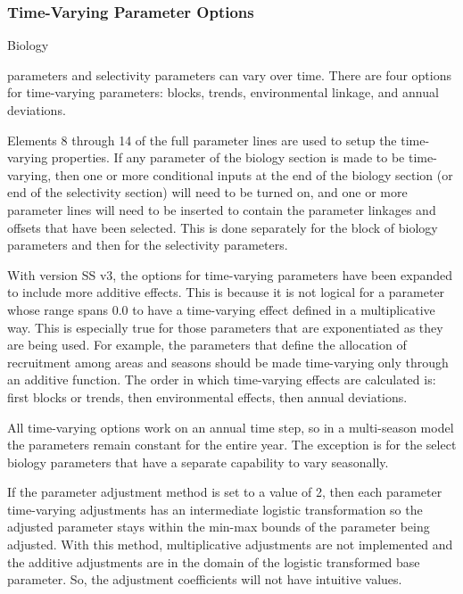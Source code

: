 \subsubsection{Time-Varying Parameter Options}
\hypertarget{TVpara}{Biology} parameters and selectivity parameters can vary over time.  There are four options for time-varying parameters:  blocks, trends, environmental linkage, and annual deviations.

Elements 8 through 14 of the full parameter lines are used to setup the time-varying properties.  If any parameter of the biology section is made to be time-varying, then one or more conditional inputs at the end of the biology section (or end of the selectivity section) will need to be turned on, and one or more parameter lines will need to be inserted to contain the parameter linkages and offsets that have been selected.  This is done separately for the block of biology parameters and then for the selectivity parameters.

With version SS v3, the options for time-varying parameters have been expanded to include more additive effects.  This is because it is not logical for a parameter whose range spans 0.0 to have a time-varying effect defined in a multiplicative way.  This is especially true for those parameters that are exponentiated as they are being used.  For example, the parameters that define the allocation of recruitment among areas and seasons should be made time-varying only through an additive function.
The order in which time-varying effects are calculated is:  first blocks or trends, then environmental effects, then annual deviations.

All time-varying options work on an annual time step, so in a multi-season model the parameters remain constant for the entire year.  The exception is for the select biology parameters that have a separate capability to vary seasonally.

If the parameter adjustment method is set to a value of 2, then each parameter time-varying adjustments has an intermediate logistic transformation so the adjusted parameter stays within the min-max bounds of the parameter being adjusted.  With this method, multiplicative adjustments are not implemented and the additive adjustments are in the domain of the logistic transformed base parameter.  So, the adjustment coefficients will not have intuitive values.


